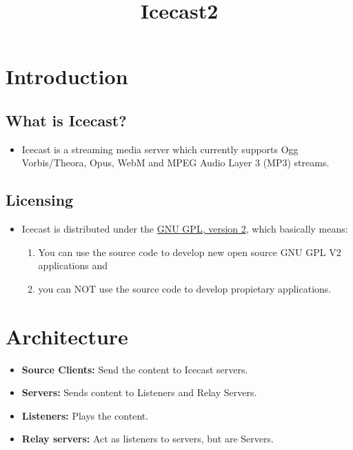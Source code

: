 \title{Icecast2}

\chapter{Introduction}

\section{What is Icecast?}

\begin{itemize}
\item Icecast is a streaming media server which currently supports Ogg
Vorbis/Theora, Opus, WebM and MPEG Audio Layer 3 (MP3) streams.
\end{itemize}


\section{Licensing}

\begin{itemize}
\item Icecast is distributed under the
  \href{http://www.gnu.org/licenses/gpl.html}{GNU GPL, version 2},
  which basically means:
\begin{enumerate}
\item You can use the source code to develop new open source GNU GPL
  V2 applications and
\item you can NOT use the source code to develop propietary applications.
\end{enumerate}
\end{itemize}



\chapter{Architecture}

\begin{itemize}
\item \textbf{Source Clients:} Send the content to Icecast servers.
\item \textbf{Servers:} Sends content to Listeners and Relay Servers.
\item \textbf{Listeners:} Plays the content.
\item \textbf{Relay servers:} Act as listeners to servers, but are Servers.
\end{itemize}


